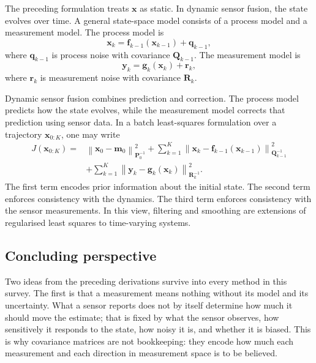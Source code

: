 \documentclass[11pt,oneside,openany]{book}
\begin{document}
The preceding formulation treats $\mathbf{x}$ as static. In dynamic sensor fusion, the state evolves over time. A general state-space model consists of a process model and a measurement model. The process model is
\begin{equation}
\mathbf{x}_k
=
\mathbf{f}_{k-1}
\left(
\mathbf{x}_{k-1}
\right)
+
\mathbf{q}_{k-1},
\end{equation}
where $\mathbf{q}_{k-1}$ is process noise with covariance $\mathbf{Q}_{k-1}$. The measurement model is
\begin{equation}
\mathbf{y}_k
=
\mathbf{g}_k
\left(
\mathbf{x}_k
\right)
+
\mathbf{r}_k,
\end{equation}
where $\mathbf{r}_k$ is measurement noise with covariance $\mathbf{R}_k$.

Dynamic sensor fusion combines prediction and correction. The process model predicts how the state evolves, while the measurement model corrects that prediction using sensor data. In a batch least-squares formulation over a trajectory $\mathbf{x}_{0:K}$, one may write
\begin{align}
J(\mathbf{x}_{0:K})
=&
\left\|
\mathbf{x}_0
-
\mathbf{m}_0
\right\|_{\mathbf{P}_0^{-1}}^2
+
\sum_{k=1}^{K}
\left\|
\mathbf{x}_k
-
\mathbf{f}_{k-1}
\left(
\mathbf{x}_{k-1}
\right)
\right\|_{\mathbf{Q}_{k-1}^{-1}}^2 \nonumber \\
&+
\sum_{k=1}^{K}
\left\|
\mathbf{y}_k
-
\mathbf{g}_k
\left(
\mathbf{x}_k
\right)
\right\|_{\mathbf{R}_k^{-1}}^2.
\end{align}
The first term encodes prior information about the initial state. The second term enforces consistency with the dynamics. The third term enforces consistency with the sensor measurements. In this view, filtering and smoothing are extensions of regularised least squares to time-varying systems.



\subsection{Concluding perspective}

Two ideas from the preceding derivations survive into every method in this survey. The first is that a measurement means nothing without its model and its uncertainty. What a sensor reports does not by itself determine how much it should move the estimate; that is fixed by what the sensor observes, how sensitively it responds to the state, how noisy it is, and whether it is biased. This is why covariance matrices are not bookkeeping: they encode how much each measurement and each direction in measurement space is to be believed.
\end{document}
